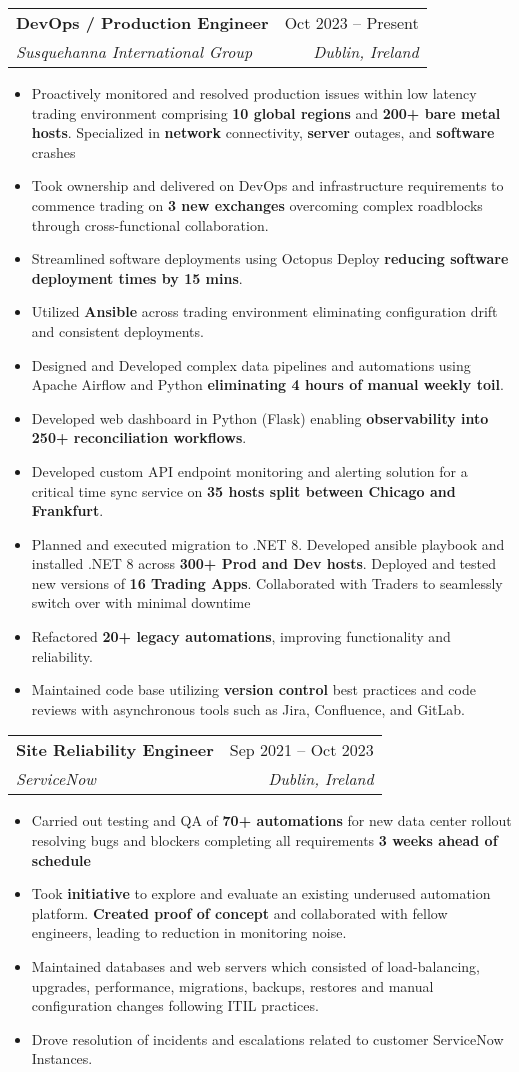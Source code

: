 \documentclass[letterpaper,11pt]{article}
\makeatletter
\newcommand{\resumeItem}[1]{
  \item\small{
    {#1\vspace{-2pt}}
  }
}
\newcommand{\resumeSubheading}[4]{
  \vspace{1pt}\item
    \begin{tabular*}{0.97\textwidth}[t]{l@{\extracolsep{\fill}}r}
      \textbf{#1} & #2 \\
      \textit{\small#3} & \textit{\small #4} \\
    \end{tabular*}\vspace{-7pt}
}
\newcommand{\resumeItemListStart}{\begin{itemize}}
\newcommand{\resumeItemListEnd}{\end{itemize}\vspace{-5pt}}
\makeatother
\begin{document}
    \resumeSubheading
      {DevOps / Production Engineer}{Oct 2023 -- Present}
      {Susquehanna International Group}{Dublin, Ireland}
      \resumeItemListStart
        \resumeItem{Proactively monitored and resolved production issues within low latency trading environment comprising \textbf{10 global regions} and \textbf{200+ bare metal hosts}. Specialized in \textbf{network} connectivity, \textbf{server} outages, and \textbf{software} crashes}
        \resumeItem{Took ownership and delivered on DevOps and infrastructure requirements to commence trading on \textbf{3 new exchanges} overcoming complex roadblocks through cross-functional collaboration.}
        \resumeItem{Streamlined software deployments using Octopus Deploy \textbf{reducing software deployment times by 15 mins}.}
        \resumeItem{Utilized \textbf{Ansible} across trading environment eliminating configuration drift and consistent deployments.}
        \resumeItem{Designed and Developed complex data pipelines and automations using Apache Airflow and Python \textbf{eliminating 4 hours of manual weekly toil}.}
        \resumeItem{Developed web dashboard in Python (Flask) enabling \textbf{observability into 250+ reconciliation workflows}.}
        \resumeItem{Developed custom API endpoint monitoring and alerting solution for a critical time sync service on \textbf{35 hosts split between Chicago and Frankfurt}.}
        \resumeItem{Planned and executed migration to .NET 8. Developed ansible playbook and installed .NET 8 across \textbf{300+ Prod and Dev hosts}. Deployed and tested new versions of \textbf{16 Trading Apps}. Collaborated with Traders to seamlessly switch over with minimal downtime}
        \resumeItem{Refactored \textbf{20+ legacy automations}, improving functionality and reliability.}
        \resumeItem{Maintained code base utilizing \textbf{version control} best practices and code reviews with asynchronous tools such as Jira, Confluence, and GitLab.}
      \resumeItemListEnd

    \resumeSubheading
      {Site Reliability Engineer}{Sep 2021 -- Oct 2023}
      {ServiceNow}{Dublin, Ireland}
      \resumeItemListStart
        \resumeItem{Carried out testing and QA of \textbf{70+ automations} for new data center rollout resolving bugs and blockers completing all requirements \textbf{3 weeks ahead of schedule}}
        \resumeItem{Took \textbf{initiative} to explore and evaluate an existing underused automation platform. \textbf{Created proof of concept} and collaborated with fellow engineers, leading to reduction in monitoring noise.}
        \resumeItem{Maintained databases and web servers which consisted of load-balancing, upgrades, performance, migrations, backups, restores and manual configuration changes following ITIL practices.}
        \resumeItem{Drove resolution of incidents and escalations related to customer ServiceNow Instances.}
    \resumeItemListEnd
\end{document}
